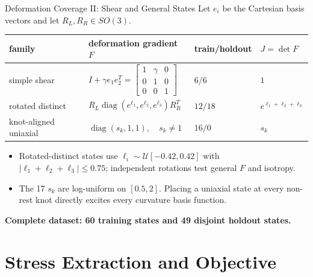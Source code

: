 \documentclass[aspectratio=169,10pt]{beamer}
\begin{document}
\begin{frame}{Deformation Coverage II: Shear and General States}
  \small
  Let $e_i$ be the Cartesian basis vectors and let $R_L,R_R\in SO(3)$.
  \begin{table}
    \centering
    \renewcommand{\arraystretch}{1.35}
    \begin{tabular}{llll}
      \toprule
      family & deformation gradient $F$ & train/holdout & $J=\det F$ \\
      \midrule
      simple shear
        & $I+\gamma e_1e_2^T
          =\begin{bmatrix}1&\gamma&0\\0&1&0\\0&0&1\end{bmatrix}$
        & $6/6$ & $1$ \\
      rotated distinct
        & $R_L\operatorname{diag}(e^{\ell_1},e^{\ell_2},e^{\ell_3})R_R^T$
        & $12/18$ & $e^{\ell_1+\ell_2+\ell_3}$ \\
      knot-aligned uniaxial
        & $\operatorname{diag}(s_k,1,1),\quad s_k\neq1$
        & $16/0$ & $s_k$ \\
      \bottomrule
    \end{tabular}
  \end{table}

  \begin{itemize}
    \item Rotated-distinct states use
      $\ell_i\sim\mathcal U[-0.42,0.42]$ with
      $\lvert\ell_1+\ell_2+\ell_3\rvert\le0.75$; independent rotations test
      general $F$ and isotropy.
    \item The 17 $s_k$ are log-uniform on $[0.5,2]$. Placing a uniaxial state
      at every non-rest knot directly excites every curvature basis function.
  \end{itemize}

  \vspace{0.2em}
  \centering
  \textbf{Complete dataset: 60 training states and 49 disjoint holdout states.}
\end{frame}

\section{Stress Extraction and Objective}
\end{document}
